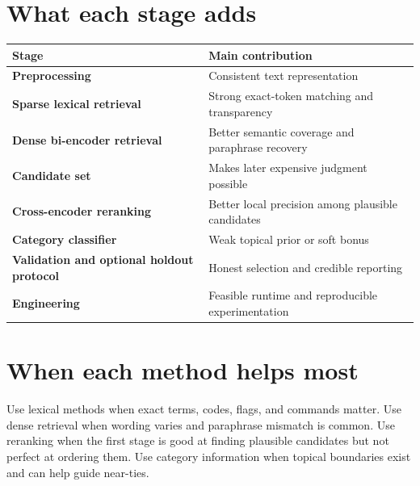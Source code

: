 \documentclass[11pt,oneside]{report}
\begin{document}
\section*{What each stage adds}
\begin{center}
\begin{tabularx}{\textwidth}{>{\bfseries}lY}
\toprule
Stage & Main contribution \\
\midrule
Preprocessing & Consistent text representation \\
Sparse lexical retrieval & Strong exact-token matching and transparency \\
Dense bi-encoder retrieval & Better semantic coverage and paraphrase recovery \\
Candidate set & Makes later expensive judgment possible \\
Cross-encoder reranking & Better local precision among plausible candidates \\
Category classifier & Weak topical prior or soft bonus \\
Validation and optional holdout protocol & Honest selection and credible reporting \\
Engineering & Feasible runtime and reproducible experimentation \\
\bottomrule
\end{tabularx}
\end{center}

\section*{When each method helps most}
Use lexical methods when exact terms, codes, flags, and commands matter. Use dense retrieval when wording varies and paraphrase mismatch is common. Use reranking when the first stage is good at finding plausible candidates but not perfect at ordering them. Use category information when topical boundaries exist and can help guide near-ties.
\end{document}
